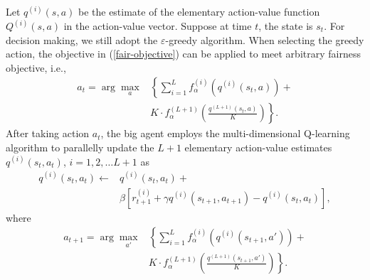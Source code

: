 \documentclass[journal,comsoc]{IEEEtran}
\begin{document}
Let  $ {q^{\left( i \right)}}\left( {s,a} \right) $ be the estimate of the elementary action-value function ${Q^{\left( i \right)}}\left( {s,a} \right)$  in the action-value vector. Suppose at time $ t $, the state is $ s_t $. For decision making, we still adopt the  $ \varepsilon $-greedy algorithm. When selecting the greedy action, the objective in (\ref{fair-objective}) can be applied to meet arbitrary fairness objective, i.e., 
\begin{align}\label{greedy_action}
{a_t} = \arg {\max _a} &\left\{ \sum\limits_{i = 1}^L {f_\alpha ^{\left( i \right)}\left( {{q^{\left( i \right)}}\left( {{s_t},a} \right)} \right)} + \right.\nonumber  \\
& \left. K \cdot f_\alpha ^{\left( {L + 1} \right)}\left( {\frac{{{q^{\left( {L + 1} \right)}}\left( {{s_t},a} \right)}}{K}} \right) \right\}.
\end{align}
After taking action $ a_t $, the big agent employs the multi-dimensional Q-learning algorithm to parallelly update the  $ L+1 $ elementary action-value estimates   ${q^{\left( i \right)}}({s_t},{a_t})$,  $i = 1,2, \ldots L + 1$ as
\begin{align}\label{Qupdate2}
{q^{\left( i \right)}}\left( {{s_t},{a_t}} \right) \leftarrow &{q^{\left( i \right)}}\left( {{s_t},{a_t}} \right) +  \nonumber \\
& \beta \left[ {r_{t + 1}^{\left( i \right)} + \gamma {q^{\left( i \right)}}\left( {{s_{t + 1}},{a_{t + 1}}} \right) - {q^{\left( i \right)}}\left( {{s_t},{a_t}} \right)} \right],
\end{align}
where
\begin{align}\label{greedy_action2}
{a_{t + 1}} = \arg {\max _{a'}} & \left\{ \sum\limits_{i = 1}^L {f_\alpha ^{\left( i \right)}\left( {{q^{\left( i \right)}}\left( {{s_{t + 1}},a'} \right)} \right)}  + 
\right.\nonumber  \\
& \left. K \cdot f_\alpha ^{\left( {L + 1} \right)}\left( {\frac{{{q^{\left( {L + 1} \right)}}\left( {{s_{t + 1}},a'} \right)}}{K}} \right) \right\}.
\end{align}
\end{document}
